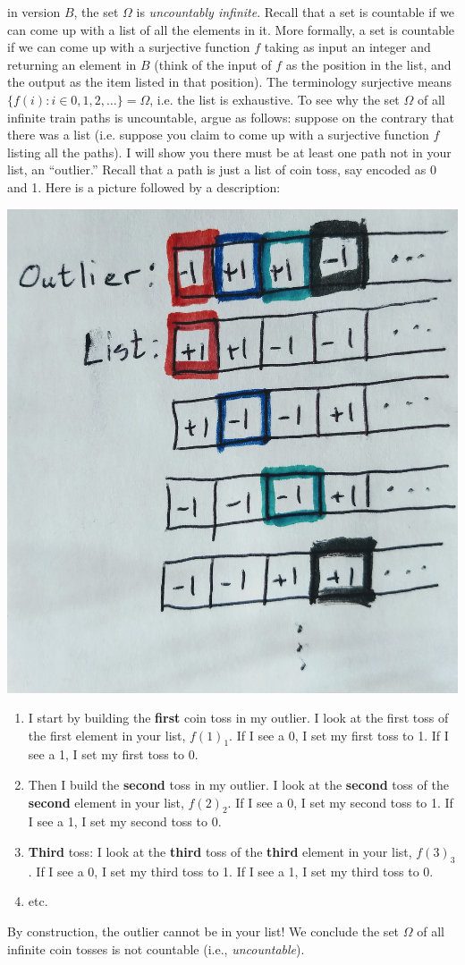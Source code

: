 \documentclass{article}
\begin{document}
 in version $B$, the set $\Omega$ is \emph{uncountably infinite}. Recall that a set is countable if we can come up with a list of all the elements in it. More formally, a set is countable if we can come up with a surjective function $f$ taking as input an integer and returning an element in $B$ (think of the input of $f$ as the position in the list, and the output as the item listed in that position). The terminology surjective means $\{f(i) : i \in 0, 1, 2, \dots\} = \Omega$, i.e. the list is exhaustive. To see why the set $\Omega$ of all infinite train paths is uncountable, argue as follows: suppose on the contrary that there was a list (i.e. suppose you claim to come up with a surjective function $f$ listing all the paths). I will show you there must be at least one path not in your list, an ``outlier.'' Recall that a path is just a list of coin toss, say encoded as 0 and 1. Here is a picture followed by a description:
\begin{center}
	\includegraphics[width=0.5\linewidth]{figures/cantor-diag}
\end{center}
\begin{enumerate}
	\item I start by building the {\bf first} coin toss in my outlier. I look at the first toss of the first element in your list, $f(1)_1$. If I see a 0, I set my first toss to 1. If I see a 1, I set my first toss to 0. 
	\item Then I build the {\bf second} toss in my outlier. I look at the {\bf second} toss of the {\bf second} element in your list, $f(2)_2$. If I see a 0, I set my second toss to 1. If I see a 1, I set my second toss to 0.
	\item {\bf Third} toss: I look at the {\bf third} toss of the {\bf third} element in your list, $f(3)_3$. If I see a 0, I set my third toss to 1. If I see a 1, I set my third toss to 0.
	\item etc.
\end{enumerate}
By construction, the outlier cannot be in your list! We conclude the set $\Omega$ of all infinite coin tosses is not countable (i.e., \emph{uncountable}). 
\end{document}

